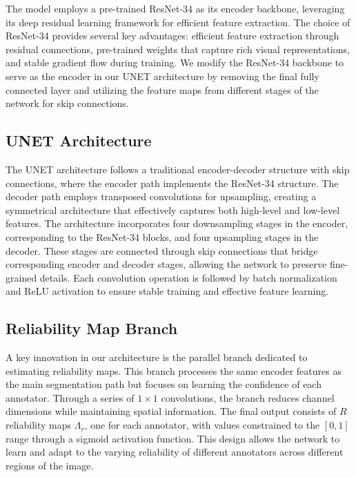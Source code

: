 The model employs a pre-trained ResNet-34 as its encoder backbone,
leveraging its deep residual learning framework for efficient feature
extraction. The choice of ResNet-34 provides several key advantages:
efficient feature extraction through residual connections,
pre-trained weights that capture rich visual representations, and
stable gradient flow during training. We modify the ResNet-34
backbone to serve as the encoder in our UNET architecture by removing
the final fully connected layer and utilizing the feature maps from
different stages of the network for skip connections.

\subsection{UNET Architecture}

The UNET architecture follows a traditional encoder-decoder structure
with skip connections, where the encoder path implements the
ResNet-34 structure. The decoder path employs transposed convolutions
for upsampling, creating a symmetrical architecture that effectively
captures both high-level and low-level features. The architecture
incorporates four downsampling stages in the encoder, corresponding
to the ResNet-34 blocks, and four upsampling stages in the decoder.
These stages are connected through skip connections that bridge
corresponding encoder and decoder stages, allowing the network to
preserve fine-grained details. Each convolution operation is followed
by batch normalization and ReLU activation to ensure stable training
and effective feature learning.

\subsection{Reliability Map Branch}

A key innovation in our architecture is the parallel branch dedicated
to estimating reliability maps. This branch processes the same
encoder features as the main segmentation path but focuses on
learning the confidence of each annotator. Through a series of $1
\times 1$ convolutions, the branch reduces channel dimensions while
maintaining spatial information. The final output consists of $R$
reliability maps $\Lambda_r$, one for each annotator, with values
constrained to the $[0,1]$ range through a sigmoid activation
function. This design allows the network to learn and adapt to the
varying reliability of different annotators across different regions
of the image.

